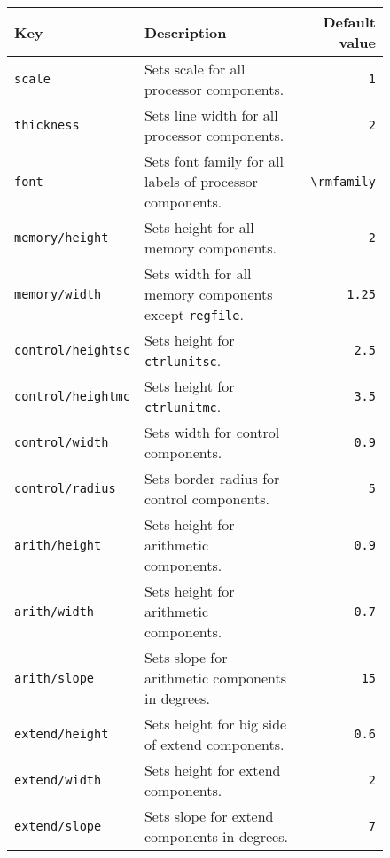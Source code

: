 \documentclass[.52pt,a4paper,titlepage]{article}
\begin{document}
\begin{figure}[htbp]
	\begin{tabularx}{\textwidth}{|lXr|}
		\hline
		Key                       & Description                                                           & Default value    \\
		\hline
		\texttt{scale}            & Sets scale for all processor components.                              & \texttt{1}       \\
		\texttt{thickness}        & Sets line width for all processor components.                         & \texttt{2}       \\
		\texttt{font}             & Sets font family for all labels of processor components.              & \verb|\rmfamily| \\
		\texttt{memory/height}    & Sets height for all memory components.                                & \texttt{2}       \\
		\texttt{memory/width}     & Sets width for all memory components except \texttt{regfile}.         & \texttt{1.25}    \\
		\texttt{control/heightsc} & Sets height for \texttt{ctrlunitsc}.                                  & \texttt{2.5}     \\
		\texttt{control/heightmc} & Sets height for \texttt{ctrlunitmc}.                                  & \texttt{3.5}     \\
		\texttt{control/width}    & Sets width for control components.                                    & \texttt{0.9}     \\
		\texttt{control/radius}   & Sets border radius for control components.                            & \texttt{5}       \\
		\texttt{arith/height}     & Sets height for arithmetic components.                                & \texttt{0.9}     \\
		\texttt{arith/width}      & Sets height for arithmetic components.                                & \texttt{0.7}     \\
		\texttt{arith/slope}      & Sets slope for arithmetic components in degrees.                      & \texttt{15}      \\
		\texttt{extend/height}    & Sets height for big side of extend components.                        & \texttt{0.6}     \\
		\texttt{extend/width}     & Sets height for extend components.                                    & \texttt{2}       \\
		\texttt{extend/slope}     & Sets slope for extend components in degrees.                          & \texttt{7}       \\

\end{tabularx}
\end{figure}
\end{document}
